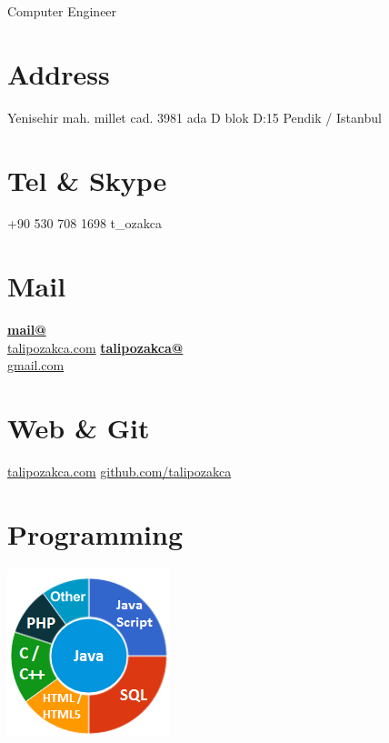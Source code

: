 \documentclass[]{friggeri-cv}
\begin{document}
      {Computer Engineer}
      

\begin{aside}
  \section{Address}
    Yenisehir mah. millet cad. 3981 ada D blok D:15 Pendik / Istanbul
    ~
  \section{Tel \& Skype}
    +90 530 708 1698
    t\_ozakca
    ~
  \section{Mail}
    \href{mailto:mail@talipozakca.com}{\textbf{mail@}\\talipozakca.com}
    \href{mailto:talipozakca@gmail.com}{\textbf{talipozakca@}\\gmail.com}
    ~
  \section{Web \& Git}
    \href{http://www.talipozakca.com}{talipozakca.com}
    \href{https://github.com/talipozakca}{github.com/talipozakca}
    ~
  \section{Programming}
    \includegraphics[scale=0.62]{img/programming.png}
    ~

\end{aside}
\end{document}
